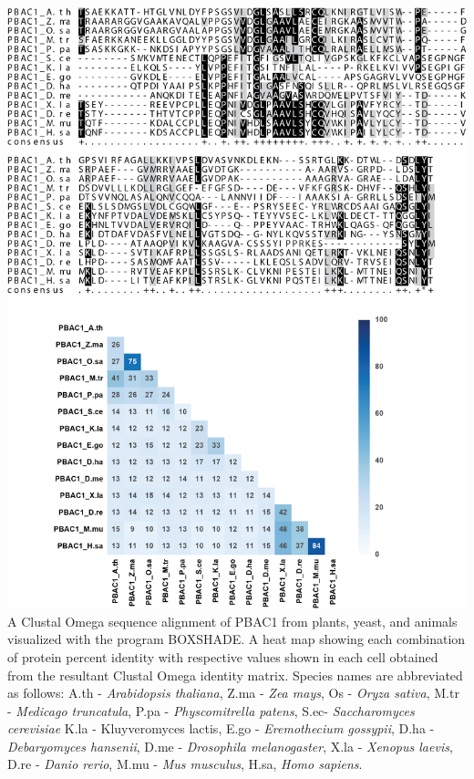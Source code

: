 \begin{FPfigure}
	\ContinuedFloat
	\centering
	\includegraphics[width=\columnwidth]{Proteasome/pbac1align2.png}
	{A Clustal Omega \citep{sievers14} sequence alignment of PBAC1 from plants, yeast, and animals visualized with the program BOXSHADE. A heat map showing each combination of protein percent identity with respective values shown in each cell obtained from the resultant Clustal Omega identity matrix. Species names are abbreviated as follows: A.th - \textit{Arabidopsis thaliana}, Z.ma - \textit{Zea mays}, Os - \textit{Oryza sativa}, M.tr - \textit{Medicago truncatula}, P.pa - \textit{Physcomitrella patens}, S.ec- \textit{Saccharomyces cerevisiae} K.la - {Kluyveromyces lactis}, E.go - \textit{Eremothecium gossypii}, D.ha - \textit{Debaryomyces hansenii}, D.me - \textit{Drosophila melanogaster}, X.la - \textit{Xenopus laevis}, D.re - \textit{Danio rerio}, M.mu - \textit{Mus musculus}, H.sa, \textit{Homo sapiens}.}
	\label{fig:pbac1align2}
\end{FPfigure}
